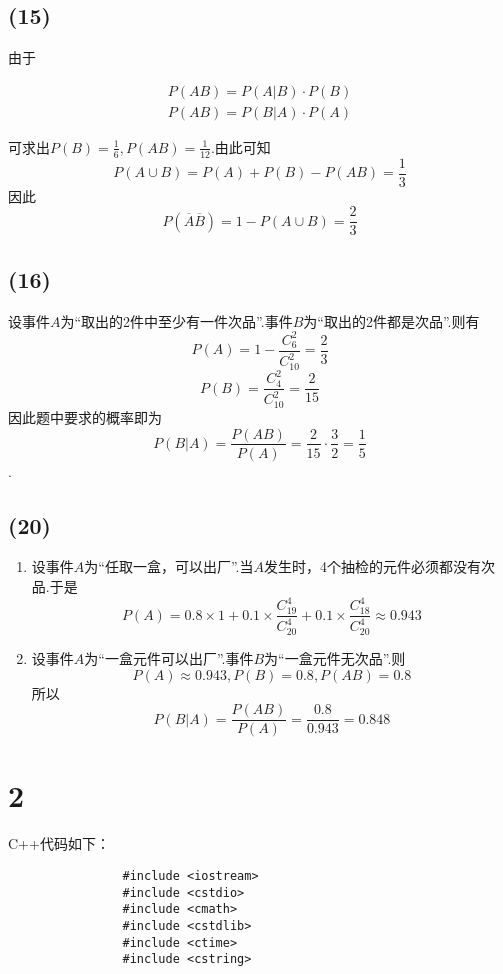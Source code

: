 \documentclass[twocolumn]{article}
\begin{document}
\begin{CJK}{UTF8}{gbsn}
			\subsection*{(15)}
				由于\begin{center}
					\begin{align*}
						P(AB)=P(A|B)\cdot P(B)\\
						P(AB)=P(B|A)\cdot P(A)
					\end{align*}
				\end{center}
				可求出$P(B)=\frac{1}{6},P(AB)=\frac{1}{12}$.由此可知\begin{displaymath}
					P(A\cup B)=P(A)+P(B)-P(AB)=\frac{1}{3}
				\end{displaymath}
				因此\begin{displaymath}
					P(\overline{A}\overline{B})=1-P(A\cup B)=\frac{2}{3}
				\end{displaymath}
			\subsection*{(16)}
				设事件$A$为``取出的2件中至少有一件次品''.事件$B$为``取出的2件都是次品''.则有\[P(A)=1-\frac{C_6^2}{C_{10}^2}=\frac{2}{3}\]\[P(B)=\frac{C_4^2}{C_{10}^2}=\frac{2}{15}\]因此题中要求的概率即为\[P(B|A)=\frac{P(AB)}{P(A)}=\frac{2}{15}\cdot\frac{3}{2}=\frac{1}{5}\].
			\subsection*{(20)}
				\begin{enumerate}[(1)]
					\item 设事件$A$为``任取一盒，可以出厂''.当$A$发生时，4个抽检的元件必须都没有次品.于是\[P(A)=0.8\times1+0.1\times\frac{C_{19}^4}{C_{20}^4}+0.1\times\frac{C_{18}^4}{C_{20}^4}\approx0.943\]
					\item 设事件$A$为``一盒元件可以出厂''.事件$B$为``一盒元件无次品''.则\[P(A)\approx0.943,P(B)=0.8,P(AB)=0.8\]所以\[P(B|A)=\frac{P(AB)}{P(A)}=\frac{0.8}{0.943}=0.848\]
					
				\end{enumerate}
			\section*{2}
				C++代码如下：
				\begin{verbatim}
				#include <iostream>
				#include <cstdio>
				#include <cmath>
				#include <cstdlib>
				#include <ctime>
				#include <cstring>
				

\end{verbatim}
\end{CJK}
\end{document}
